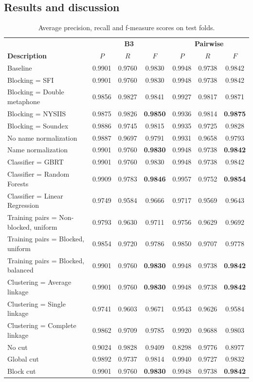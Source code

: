 \documentclass{article}
\begin{document}
\subsection{Results and discussion}

\begin{table}
\caption{Average precision, recall and f-measure scores on test folds.}
\label{table:results}
\centering
\begin{tabular}{|l|c c c|c c c|}
  \hline
                       & \multicolumn{3}{|c|}{\textbf{B3}} & \multicolumn{3}{|c|}{\textbf{Pairwise}} \\
  \textbf{Description} & $P$ & $R$ & $F$ & $P$ & $R$ & $F$\\
  \hline
  \hline
Baseline & 0.9901 & 0.9760 & 0.9830 & 0.9948 & 0.9738 & 0.9842 \\
\hline
Blocking = SFI & 0.9901 & 0.9760 & 0.9830 & 0.9948 & 0.9738 & 0.9842 \\
Blocking = Double metaphone & 0.9856 & 0.9827 & 0.9841 & 0.9927 & 0.9817 & 0.9871 \\
Blocking = NYSIIS & 0.9875 & 0.9826 & \textbf{0.9850} & 0.9936 & 0.9814 & \textbf{0.9875} \\
Blocking = Soundex & 0.9886 & 0.9745 & 0.9815 & 0.9935 & 0.9725 & 0.9828 \\
\hline
No name normalization & 0.9887 & 0.9697 & 0.9791 & 0.9931 & 0.9658 & 0.9793 \\
Name normalization & 0.9901 & 0.9760 & \textbf{0.9830} & 0.9948 & 0.9738 & \textbf{0.9842} \\
\hline
Classifier = GBRT & 0.9901 & 0.9760 & 0.9830 & 0.9948 & 0.9738 & 0.9842 \\
Classifier = Random Forests & 0.9909 & 0.9783 & \textbf{0.9846} & 0.9957 & 0.9752 & \textbf{0.9854} \\
Classifier = Linear Regression & 0.9749 & 0.9584 & 0.9666 & 0.9717 & 0.9569 & 0.9643 \\
\hline
Training pairs = Non-blocked, uniform & 0.9793 & 0.9630 & 0.9711 & 0.9756 & 0.9629 & 0.9692 \\
Training pairs = Blocked, uniform & 0.9854 & 0.9720 & 0.9786 & 0.9850 & 0.9707 & 0.9778 \\
Training pairs = Blocked, balanced & 0.9901 & 0.9760 & \textbf{0.9830} & 0.9948 & 0.9738 & \textbf{0.9842} \\
\hline
Clustering = Average linkage & 0.9901 & 0.9760 & \textbf{0.9830} & 0.9948 & 0.9738 & \textbf{0.9842} \\
Clustering = Single linkage & 0.9741 & 0.9603 & 0.9671 & 0.9543 & 0.9626 & 0.9584 \\
Clustering = Complete linkage & 0.9862 & 0.9709 & 0.9785 & 0.9920 & 0.9688 & 0.9803 \\
\hline
No cut & 0.9024 & 0.9828 & 0.9409 & 0.8298 & 0.9776 & 0.8977 \\
Global cut & 0.9892 & 0.9737 & 0.9814 & 0.9940 & 0.9727 & 0.9832 \\
Block cut & 0.9901 & 0.9760 & \textbf{0.9830} & 0.9948 & 0.9738 & \textbf{0.9842} \\
  \hline
\end{tabular}
\end{table}
\end{document}
